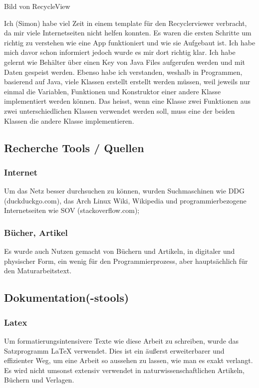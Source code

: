 \documentclass[a4paper,11pt]{article}
\begin{document}
Bild von RecycleView

Ich (Simon) habe viel Zeit in einem template für den Recyclerviewer verbracht, da mir viele Internetseiten nicht helfen konnten. Es waren die ersten Schritte um 
richtig zu verstehen wie eine App funktioniert und wie sie Aufgebaut ist. Ich habe mich davor schon informiert jedoch wurde es mir dort richtig klar. Ich habe gelernt
wie Behälter über einen Key von Java Files aufgerufen werden und mit Daten gespeist werden. Ebenso habe ich verstanden, weshalb in Programmen, basierend auf Java, viele 
Klassen erstellt erstellt werden müssen, weil jeweils nur einmal die Variablen, Funktionen und Konstruktor einer andere Klasse implementiert werden können. Das heisst, 
wenn eine Klasse zwei Funktionen aus zwei unterschiedlichen Klassen verwendet werden soll, muss eine der beiden Klassen die andere Klasse implementieren. 


\subsection{Recherche Tools / Quellen}
\subsubsection{Internet}
Um das Netz besser durchsuchen zu können, wurden Suchmaschinen wie DDG (duckduckgo.com), das Arch Linux Wiki, Wikipedia und programmierbezogene Internetseiten wie SOV (stackoverflow.com);
\subsubsection{Bücher, Artikel}
Es wurde auch Nutzen gemacht von Büchern und Artikeln, in digitaler und physischer Form, ein wenig für den Programmierprozess, aber hauptsächlich für den Maturarbeitstext.

\subsection{Dokumentation(-stools)}
\subsubsection{Latex}
Um formatierungsintensivere Texte wie diese Arbeit zu schreiben, wurde das Satzprogramm LaTeX verwendet. Dies ist ein äußerst erweiterbarer und effizienter Weg, um eine Arbeit so aussehen zu lassen, wie man es exakt verlangt. Es wird nicht umsonst extensiv verwendet in naturwissenschaftlichen Artikeln, Büchern und Verlagen.
\end{document}
